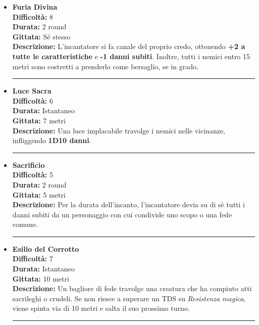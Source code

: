 \documentclass[../manuale_main.tex]{subfiles}
\begin{document}
\begin{itemize}

\item \textbf{Furia Divina} \\
\textbf{Difficoltà:} 8 \\
\textbf{Durata:} 2 round \\
\textbf{Gittata:} Sé stesso \\
\textbf{Descrizione:} L’incantatore si fa canale del proprio credo, ottenendo \textbf{+2 a tutte le caratteristiche} e \textbf{-1 danni subiti}. Inoltre, tutti i nemici entro 15 metri sono costretti a prenderlo come bersaglio, se in grado.

\vspace{0.5cm}\rule{\textwidth}{0.4pt}\vspace{1cm}

\item \textbf{Luce Sacra} \\
\textbf{Difficoltà:} 6 \\
\textbf{Durata:} Istantaneo \\
\textbf{Gittata:} 7 metri \\
\textbf{Descrizione:} Una luce implacabile travolge i nemici nelle vicinanze, infliggendo \textbf{1D10 danni}.

\vspace{0.5cm}\rule{\textwidth}{0.4pt}\vspace{1cm}

\item \textbf{Sacrificio} \\
\textbf{Difficoltà:} 5 \\
\textbf{Durata:} 2 round \\
\textbf{Gittata:} 5 metri \\
\textbf{Descrizione:} Per la durata dell'incanto, l’incantatore devia su di sè tutti i danni subiti da un personaggio con cui condivide uno scopo o una fede comune.

\vspace{0.5cm}\rule{\textwidth}{0.4pt}\vspace{1cm}

\item \textbf{Esilio del Corrotto} \\
\textbf{Difficoltà:} 7 \\
\textbf{Durata:} Istantaneo \\
\textbf{Gittata:} 10 metri \\
\textbf{Descrizione:} Un bagliore di fede travolge una creatura che ha compiuto atti sacrileghi o crudeli. Se non riesce a superare un TDS su \textit{Resistenza magica}, viene spinta via di 10 metri e salta il suo prossimo turno.

\vspace{0.5cm}\rule{\textwidth}{0.4pt}\vspace{1cm}

\end{itemize}
\end{document}
